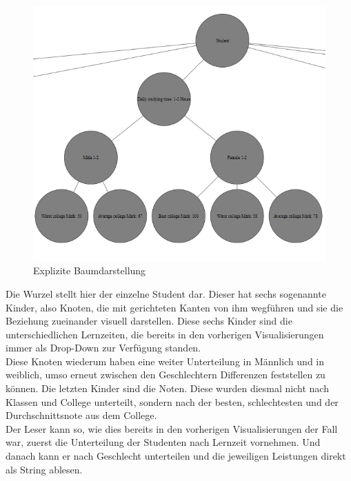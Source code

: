 \documentclass[usegeometry=true]{scrartcl}
\begin{document}
\begin{figure}[h]
\begin{center}
	\includegraphics[scale=.75]{BspBaum.png}
	\caption{Explizite Baumdarstellung}
	\label{Baum}
\end{center}
\end{figure}

\noindent Die Wurzel stellt hier der einzelne Student dar. Dieser hat sechs sogenannte Kinder, also Knoten, die mit gerichteten Kanten von ihm wegführen und sie die Beziehung zueinander visuell darstellen. Diese sechs Kinder sind die unterschiedlichen Lernzeiten, die bereits in den vorherigen Visualisierungen immer als Drop-Down zur Verfügung standen.\\
Diese Knoten wiederum haben eine weiter Unterteilung in Männlich und in weiblich, umso erneut zwischen den Geschlechtern Differenzen feststellen zu können.
Die letzten Kinder sind die Noten. Diese wurden diesmal nicht nach Klassen und College unterteilt, sondern nach der besten, schlechtesten und der Durchschnittsnote aus dem College.\\
Der Leser kann so, wie dies bereits in den vorherigen Visualisierungen der Fall war, zuerst die Unterteilung der Studenten nach Lernzeit vornehmen. Und danach kann er nach Geschlecht unterteilen und die jeweiligen Leistungen direkt als String ablesen.\\
\end{document}
